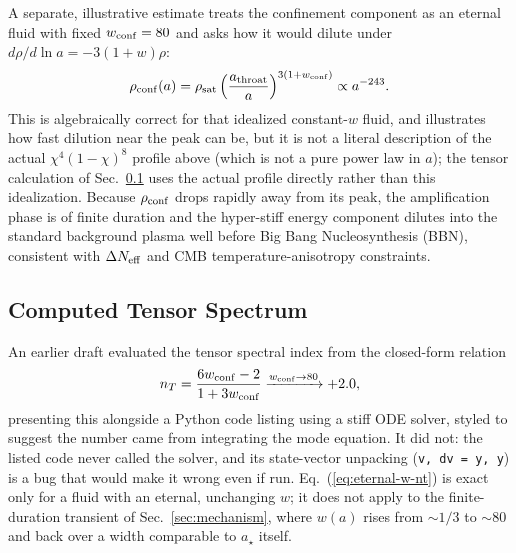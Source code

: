 \documentclass[twocolumn, PRD, amsmath, amssymb, aps, nofootinbib]{revtex4-2}
\begin{document}
A separate, illustrative estimate treats the confinement component as an eternal fluid with fixed $w_{\rm conf}=80$ and asks how it would dilute under $d\rho/d\ln a = -3(1+w)\rho$:
\begin{equation}
\rho_{\rm conf}(a) = \rho_{\rm sat} \left(\frac{a_{\rm throat}}{a}\right)^{3(1+w_{\rm conf})} \propto a^{-243}.
\end{equation}
This is algebraically correct for that idealized constant-$w$ fluid, and illustrates how fast dilution near the peak can be, but it is not a literal description of the actual $\chi^4(1-\chi)^8$ profile above (which is not a pure power law in $a$); the tensor calculation of Sec.~\ref{sec:tensor} uses the actual profile directly rather than this idealization. Because $\rho_{\rm conf}$ drops rapidly away from its peak, the amplification phase is of finite duration and the hyper-stiff energy component dilutes into the standard background plasma well before Big Bang Nucleosynthesis (BBN), consistent with $\Delta N_{\rm eff}$ and CMB temperature-anisotropy constraints.

\subsection{Computed Tensor Spectrum}
\label{sec:tensor}
An earlier draft evaluated the tensor spectral index from the closed-form relation
\begin{equation}
n_T = \frac{6w_{\rm conf} - 2}{1 + 3w_{\rm conf}} \xrightarrow{w_{\rm conf}\to80} +2.0,
\label{eq:eternal-w-nt}
\end{equation}
presenting this alongside a Python code listing using a stiff ODE solver, styled to suggest the number came from integrating the mode equation. It did not: the listed code never called the solver, and its state-vector unpacking (\texttt{v, dv = y, y}) is a bug that would make it wrong even if run. Eq.~(\ref{eq:eternal-w-nt}) is exact only for a fluid with an eternal, unchanging $w$; it does not apply to the finite-duration transient of Sec.~\ref{sec:mechanism}, where $w(a)$ rises from $\sim1/3$ to $\sim80$ and back over a width comparable to $a_\star$ itself.
\end{document}
